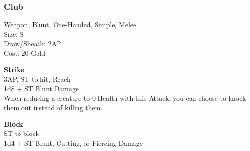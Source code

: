\subsubsection{Club}\label{weapon:club}
Weapon, Blunt, One-Handed, Simple, Melee\\
Size: S\\
Draw/Sheath: 2AP\\
Cost: 20 Gold

\textbf{Strike}\\
3AP, ST to hit,  Reach\\
1d8 + \texttimes ST Blunt Damage\\
When reducing a creature to 0 Health with this Attack, you can choose to knock them out instead of killing them.

\textbf{Block}\\
ST to block\\
1d4 + \texttimes ST Blunt, Cutting, or Piercing Damage


